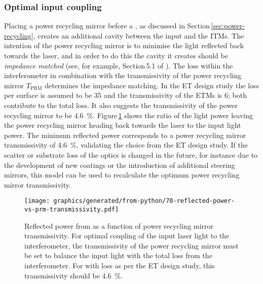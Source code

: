 \subsubsection{Optimal input coupling}
Placing a power recycling mirror before a \MI{}, as discussed in Section\,\ref{sec:power-recycling}, creates an additional cavity between the input and the \glspl{ITM}. The intention of the power recycling mirror is to minimise the light reflected back towards the laser, and in order to do this the cavity it creates should be \emph{impedance matched} (see, for example, Section\,5.1 of \cite{Freise2010}). The loss within the interferometer in combination with the transmissivity of the power recycling mirror $T_{\text{PRM}}$ determines the impedance matching. In the \gls{ET} design study the loss per surface is assumed to be \SI{35}{\ppm} and the transmissivity of the \glspl{ETM} is \SI{6}{\ppm}; both contribute to the total loss. It also suggests the transmissivity of the power recycling mirror to be \SI{4.6}{\percent}. Figure\,\ref{fig:reflected-power-vs-prm-trans} shows the ratio of the light power leaving the power recycling mirror heading back towards the laser to the input light power. The minimum reflected power corresponds to a power recycling mirror transmissivity of \SI{4.6}{\percent}, validating the choice from the \gls{ET} design study. If the scatter or substrate loss of the optics is changed in the future, for instance due to the development of new coatings or the introduction of additional steering mirrors, this model can be used to recalculate the optimum power recycling mirror transmissivity.

\begin{figure}
  \centering
  \texttt{[image: graphics/generated/from-python/70-reflected-power-vs-prm-transmissivity.pdf]}
  \caption[Reflected power from \ETLF{} as a function of power recycling mirror transmissivity]{\label{fig:reflected-power-vs-prm-trans}Reflected power from \ETLF{} as a function of power recycling mirror transmissivity. For optimal coupling of the input laser light to the interferometer, the transmissivity of the power recycling mirror must be set to balance the input light with the total loss from the interferometer. For \ETLF{} with loss as per the \gls{ET} design study, this transmissivity should be \SI{4.6}{\percent}.}
\end{figure}

